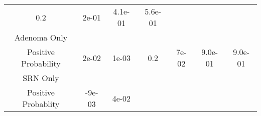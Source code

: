 \documentclass[12pt,]{article}
\begin{document}
\begin{longtable}[]{@{}ccccccc@{}}
\begin{minipage}[t]{0.09\columnwidth}
0.2\strut
\end{minipage} & \begin{minipage}[t]{0.11\columnwidth}\centering\strut
2e-01\strut
\end{minipage} & \begin{minipage}[t]{0.07\columnwidth}\centering\strut
4.1e-01\strut
\end{minipage} & \begin{minipage}[t]{0.10\columnwidth}\centering\strut
5.6e-01\strut
\end{minipage}\tabularnewline
\begin{minipage}[t]{0.22\columnwidth}\centering\strut
Adenoma Only\strut
\end{minipage}\tabularnewline
\begin{minipage}[t]{0.22\columnwidth}\centering\strut
Positive Probability\strut
\end{minipage} & \begin{minipage}[t]{0.10\columnwidth}\centering\strut
2e-02\strut
\end{minipage} & \begin{minipage}[t]{0.12\columnwidth}\centering\strut
1e-03\strut
\end{minipage} & \begin{minipage}[t]{0.09\columnwidth}\centering\strut
0.2\strut
\end{minipage} & \begin{minipage}[t]{0.11\columnwidth}\centering\strut
7e-02\strut
\end{minipage} & \begin{minipage}[t]{0.07\columnwidth}\centering\strut
9.0e-01\strut
\end{minipage} & \begin{minipage}[t]{0.10\columnwidth}\centering\strut
9.0e-01\strut
\end{minipage}\tabularnewline
\begin{minipage}[t]{0.22\columnwidth}\centering\strut
SRN Only\strut
\end{minipage}\tabularnewline
\begin{minipage}[t]{0.22\columnwidth}\centering\strut
Positive Probablity\strut
\end{minipage} & \begin{minipage}[t]{0.10\columnwidth}\centering\strut
-9e-03\strut
\end{minipage} & \begin{minipage}[t]{0.12\columnwidth}\centering\strut
4e-02\strut
\end{minipage} & \begin{minipage}[t]{0.09\columnwidth}\centering\strut

\end{minipage}
\end{longtable}
\end{document}
